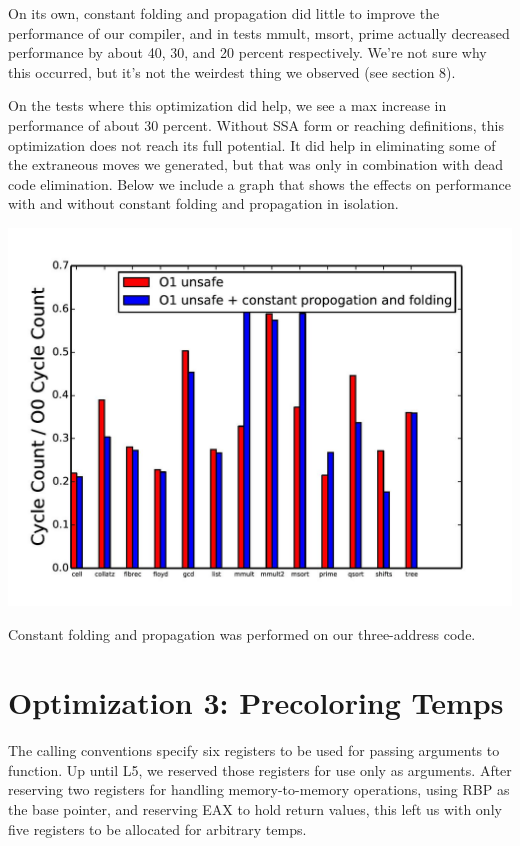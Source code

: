 \documentclass{article}
\begin{document}
On its own, constant folding and propagation did little to improve the performance of our compiler, and in tests mmult, msort, prime actually decreased performance by about 40, 30, and 20 percent respectively. We're not sure why this occurred, but it's not the weirdest thing we observed (see section 8).

On the tests where this optimization did help, we see a max increase in performance of about 30 percent. Without SSA form or reaching definitions, this optimization does not reach its full potential. It did help in eliminating some of the extraneous moves we generated, but that was only in combination with dead code elimination. Below we include a graph that shows the effects on performance with and without constant folding and propagation in isolation.

\includegraphics[scale=0.5]{O1_vs_constOpts-page-001}

Constant folding and propagation was performed on our three-address code.

\section{Optimization 3: Precoloring Temps}

The calling conventions specify six registers to be used for passing arguments to function. Up until L5, we reserved those registers for use only as arguments. After reserving two registers for handling memory-to-memory operations, using RBP as the base pointer, and reserving EAX to hold return values, this left us with only five registers to be allocated for arbitrary temps.
\end{document}
